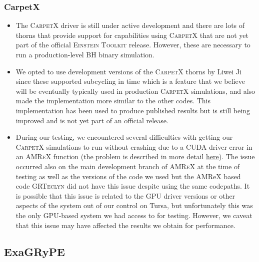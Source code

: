 \documentclass[12pt,a4paper]{article}
\numberwithin{figure}{subsection}
\newcommand{\einsteintoolkit}{\textsc{Einstein Toolkit}\xspace}
\newcommand{\grteclyn}{\textsc{GRTeclyn}\xspace}
\newcommand{\amrex}{\textsc{AMReX}\xspace}
\newcommand{\carpetx}{\textsc{CarpetX}\xspace}
\begin{document}
\subsubsection{CarpetX}
\begin{itemize}
    \item The \carpetx driver is still under active development and there are
    lots of thorns that provide support for capabilities using \carpetx that are
    not yet part of the official \einsteintoolkit release. However, these are
    necessary to run a production-level BH binary simulation.
    \item We opted to use development versions of the \carpetx thorns by Liwei
    Ji since these supported subcycling in time which is a feature that we
    believe will be eventually typically used in production \carpetx
    simulations, and also made the implementation more similar to the other codes. 
    This implementation has been used to produce published results \cite{Ji:2025rpd}
    but is still being improved and is not yet part of an official release. 
    \item During our testing, we encountered several difficulties with getting
    our \carpetx simulations to run without crashing due to a CUDA driver error in an \amrex function (the problem is
    described in more detail
    \href{https://github.com/AMReX-Codes/amrex/discussions/4795}{here}). 
    The issue
    occurred also on the main development branch of \amrex at the time of
    testing as well as the versions of the code we used but
    the AMReX based code \grteclyn did not have this issue despite using the same codepaths. 
    It is possible that this issue is related to the GPU driver versions or other aspects of the system
    out of our control on Tursa, but unfortunately this was the only GPU-based
    system we had access to for testing. 
    However, we caveat that this issue may have affected the results we obtain for performance.
\end{itemize}

\subsection{ExaGRyPE}
\end{document}
